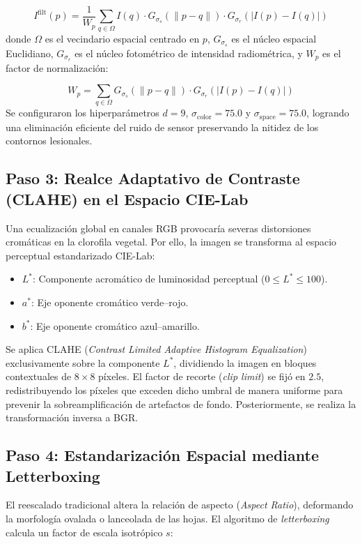 \documentclass[12pt,a4paper]{article}
\begin{document}
\begin{equation}
I^{\text{filt}}(p) = \frac{1}{W_p} \sum_{q \in \Omega} I(q) \cdot G_{\sigma_s}(\|p - q\|) \cdot G_{\sigma_r}(|I(p) - I(q)|)
\end{equation}
donde $\Omega$ es el vecindario espacial centrado en $p$, $G_{\sigma_s}$ es el núcleo espacial Euclidiano, $G_{\sigma_r}$ es el núcleo fotométrico de intensidad radiométrica, y $W_p$ es el factor de normalización:

\begin{equation}
W_p = \sum_{q \in \Omega} G_{\sigma_s}(\|p - q\|) \cdot G_{\sigma_r}(|I(p) - I(q)|)
\end{equation}
Se configuraron los hiperparámetros $d = 9$, $\sigma_{\text{color}} = 75.0$ y $\sigma_{\text{space}} = 75.0$, logrando una eliminación eficiente del ruido de sensor preservando la nitidez de los contornos lesionales.

\subsection{Paso 3: Realce Adaptativo de Contraste (CLAHE) en el Espacio CIE-Lab}
Una ecualización global en canales RGB provocaría severas distorsiones cromáticas en la clorofila vegetal. Por ello, la imagen se transforma al espacio perceptual estandarizado CIE-Lab:
\begin{itemize}
    \item $L^*$: Componente acromático de luminosidad perceptual ($0 \le L^* \le 100$).
    \item $a^*$: Eje oponente cromático verde--rojo.
    \item $b^*$: Eje oponente cromático azul--amarillo.
\end{itemize}

Se aplica CLAHE (\textit{Contrast Limited Adaptive Histogram Equalization}) exclusivamente sobre la componente $L^*$, dividiendo la imagen en bloques contextuales de $8 \times 8$ píxeles. El factor de recorte (\textit{clip limit}) se fijó en $2.5$, redistribuyendo los píxeles que exceden dicho umbral de manera uniforme para prevenir la sobreamplificación de artefactos de fondo. Posteriormente, se realiza la transformación inversa a BGR.

\subsection{Paso 4: Estandarización Espacial mediante Letterboxing}
El reescalado tradicional altera la relación de aspecto (\textit{Aspect Ratio}), deformando la morfología ovalada o lanceolada de las hojas. El algoritmo de \textit{letterboxing} calcula un factor de escala isotrópico $s$:
\end{document}
